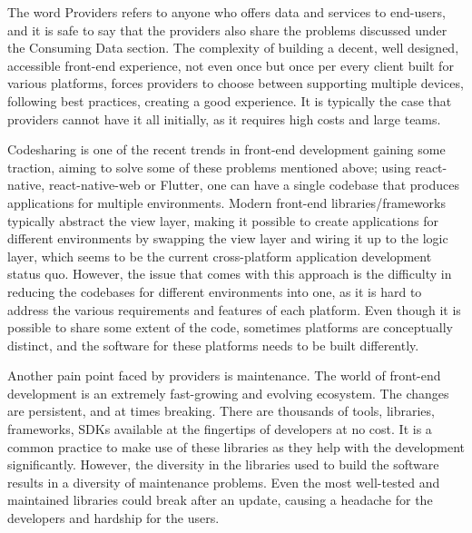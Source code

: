 The word Providers refers to anyone who offers data and services to end-users, and it is safe to say that the providers also share the problems discussed under the Consuming Data section. The complexity of building a decent, well designed, accessible front-end experience, not even once but once per every client built for various platforms, forces providers to choose between supporting multiple devices, following best practices, creating a good experience. It is typically the case that providers cannot have it all initially, as it requires high costs and large teams. 

Codesharing is one of the recent trends in front-end development gaining some traction, aiming to solve some of these problems mentioned above; using react-native, react-native-web or Flutter, one can have a single codebase that produces applications for multiple environments. Modern front-end libraries/frameworks typically abstract the view layer, making it possible to create applications for different environments by swapping the view layer and wiring it up to the logic layer, which seems to be the current cross-platform application development status quo. However, the issue that comes with this approach is the difficulty in reducing the codebases for different environments into one, as it is hard to address the various requirements and features of each platform. Even though it is possible to share some extent of the code, sometimes platforms are conceptually distinct, and the software for these platforms needs to be built differently. 

Another pain point faced by providers is maintenance. The world of front-end development is an extremely fast-growing and evolving ecosystem. The changes are persistent, and at times breaking. There are thousands of tools, libraries, frameworks, SDKs available at the fingertips of developers at no cost. It is a common practice to make use of these libraries as they help with the development significantly. However, the diversity in the libraries used to build the software results in a diversity of maintenance problems. Even the most well-tested and maintained libraries could break after an update, causing a headache for the developers and hardship for the users.